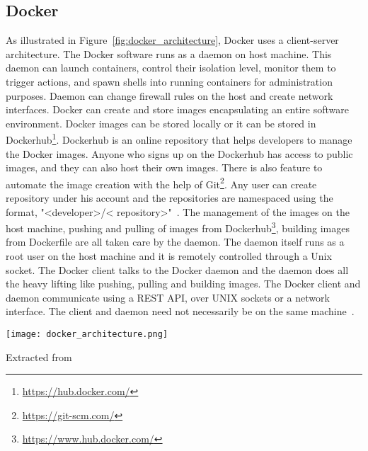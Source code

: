 \subsection{Docker}

As illustrated in Figure~\ref{fig:docker_architecture}, Docker uses a 
client-server architecture. The Docker software runs as a daemon on 
host machine. This daemon can launch containers, control their 
isolation level, monitor them to trigger actions, and spawn shells into 
running containers for administration purposes. Daemon can change 
firewall rules on the host and create network interfaces. Docker can 
create and store images encapsulating an entire software environment. 
Docker images can be stored locally or it can be stored in 
Dockerhub\footnote{\url{https://hub.docker.com/}}. Dockerhub is an 
online repository that helps developers to manage the Docker images. 
Anyone who signs up on the Dockerhub has access to public images, and 
they can also host their own images. There is also feature to automate 
the image creation with the help of 
Git\footnote{\url{https://git-scm.com/}}. Any user can create 
repository under his account and the repositories are namespaced using 
the format, "\textless developer\textgreater/\textless 
repository\textgreater"~\cite{7742298}. The management of the images on 
the host machine, pushing and pulling of images from 
Dockerhub\footnote{\url{https://www.hub.docker.com/}}, building images 
from Dockerfile are all taken care by the daemon. The daemon itself 
runs as a root user on the host machine and it is remotely controlled 
through a Unix socket. The Docker client talks to the Docker daemon and 
the daemon does all the heavy lifting like pushing, pulling and 
building images. The Docker client and daemon communicate using a REST 
API, over UNIX sockets or a network interface. The client and daemon 
need not necessarily be on the same 
machine~\cite{docker-documentation}.

\begin{center}
\texttt{[image: docker\_architecture.png]}
\label{fig:docker_architecture}
\caption*{Extracted from \cite{docker-documentation}}
\end{center}



